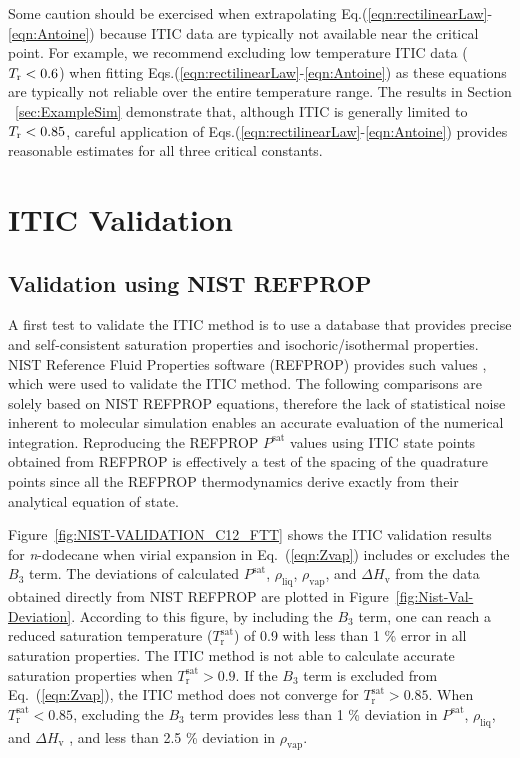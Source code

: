 \documentclass[5p,times]{elsarticle}
\begin{document}
Some caution should be exercised when extrapolating Eq.(\ref{eqn:rectilinearLaw}-\ref{eqn:Antoine}) because ITIC data are typically not available near the critical point. For example, we recommend excluding low temperature ITIC data ($T_{\rm r} < 0.6$) when fitting Eqs.(\ref{eqn:rectilinearLaw}-\ref{eqn:Antoine}) as these equations are typically not reliable over the entire temperature range. The results in Section ~\ref{sec:ExampleSim} demonstrate that, although ITIC is generally limited to $T_{\rm r} < 0.85$, careful application of Eqs.(\ref{eqn:rectilinearLaw}-\ref{eqn:Antoine}) provides reasonable estimates for all three critical constants.



\section{ITIC Validation}\label{sec:NIST-VAL}
\subsection{Validation using NIST REFPROP} 
A first test to validate the ITIC method is to use a database that provides precise and self-consistent saturation properties and isochoric/isothermal properties. NIST Reference Fluid Properties software (REFPROP) provides such values \cite{LEMMON-RP91}, which were used to validate the ITIC method. The following comparisons are solely based on NIST REFPROP equations, therefore the lack of statistical noise inherent to molecular simulation enables an accurate evaluation of the numerical integration. Reproducing the REFPROP $P^{\mathrm{sat}}$ values using ITIC state points obtained from REFPROP is effectively a test of the spacing of the quadrature points since all the REFPROP thermodynamics derive exactly from their analytical equation of state.

Figure~\ref{fig:NIST-VALIDATION_C12_FTT} shows the ITIC validation results for \textit{n}-dodecane when virial expansion in Eq.~(\ref{eqn:Zvap}) includes or excludes the $B_{3}$ term. The deviations of calculated $P^{\mathrm{sat}}$, $\rho_{\mathrm{liq}}$, $\rho_{\mathrm{vap}}$, and $\Delta H_{\mathrm{v}}$ from the data obtained directly from NIST REFPROP \cite{Lemmon2004} are plotted in Figure~\ref{fig:Nist-Val-Deviation}. According to this figure, by including the $B_3$ term, one can reach a reduced saturation temperature ($T_\mathrm{r}^{\mathrm{sat}}$) of 0.9 with less than 1 \% error in all saturation properties. The ITIC method is not able to calculate accurate saturation properties when $T_\mathrm{r}^{\mathrm{sat}}>0.9$. If the $B_3$ term is excluded from Eq.~(\ref{eqn:Zvap}), the ITIC method does not converge for $T_\mathrm{r}^{\mathrm{sat}} > 0.85$. When $T_\mathrm{r}^{\mathrm{sat}} < 0.85$, excluding the $B_3$ term provides less than 1 \% deviation in $P^{\mathrm{sat}}$, $\rho_{\mathrm{liq}}$, and $\Delta H_{\mathrm{v}}$ , and less than 2.5 \% deviation in $\rho_{\mathrm{vap}}$.
\end{document}
